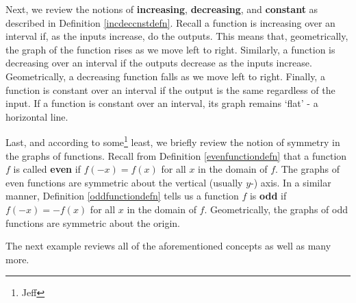 \documentclass{ximera}
\begin{document}
Next, we review the notions of \textbf{increasing}, \textbf{decreasing}, and \textbf{constant} as described in Definition \ref{incdeccnstdefn}.  Recall a function is increasing over an interval if, as the inputs increase, do the outputs.  This means that, geometrically, the graph of the function rises as we move left to right.  Similarly, a function is decreasing over an interval if the outputs decrease as the inputs increase.  Geometrically, a decreasing function falls as we move left to right.  Finally, a function is constant over an interval if the output is the same regardless of the input.  If a function is constant over an interval, its graph remains `flat' - a horizontal line.


Last, and according to some\footnote{Jeff} least, we briefly review the notion of symmetry in the graphs of functions. Recall from Definition \ref{evenfunctiondefn} that a function $f$ is called \textbf{even} if $f(-x) = f(x)$ for all $x$ in the domain of $f$.  The graphs of even functions are symmetric about the vertical (usually $y$-) axis.  In a similar manner, Definition \ref{oddfunctiondefn} tells us a function $f$ is \textbf{odd} if $f(-x) = -f(x)$ for all $x$ in the domain of $f$.  Geometrically, the graphs of odd functions are symmetric about the origin.  


The next example reviews all of the aforementioned concepts as well as many more.
\end{document}
